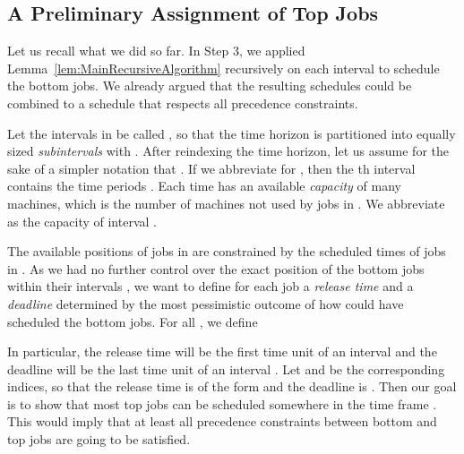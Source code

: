 \documentclass[11pt,letterpaper,oneside,english]{article}
\theoremstyle{theorem}
\begin{document}
\subsection{A Preliminary Assignment of Top Jobs}









Let us recall what we did so far. In Step 3, we applied Lemma~\ref{lem:MainRecursiveAlgorithm} 
recursively on each interval  to schedule the bottom jobs. We already
argued that the resulting schedules could be combined to a schedule 
 that respects all precedence
constraints. 


Let the intervals in  be called , so that  the time horizon  is partitioned into
 equally sized
\emph{subintervals} with . After reindexing the time horizon, let us assume for the
sake of a simpler notation that . If we abbreviate  for ,
then the th interval contains the time periods .
Each time  has an available \emph{capacity} of  many machines, which is the number of machines not used by jobs in .
We abbreviate  as
the capacity of interval .

The available positions of jobs in  are constrained by the scheduled times of jobs in . As we had no further control over the exact position of the bottom jobs within their intervals , we want to define for each job   a \emph{release time}  and a \emph{deadline}  determined by the most pessimistic outcome of how  could have scheduled
the bottom jobs.  For all , we define

In particular, the release time will be the first time unit of an interval  and the deadline
will be the last time unit of an interval . 
Let  and  be the corresponding indices, so that the release time
is of the form  and the deadline is . Then our goal is to show that
most top jobs  can be scheduled somewhere in the time frame
. This would imply that at least all precedence constraints between bottom and top jobs are going to be satisfied. 
\end{document}
